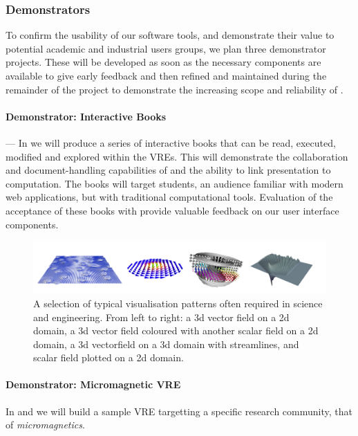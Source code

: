 \subsubsection{Demonstrators}


To confirm the usability of our software tools, and demonstrate their
value to potential academic and industrial users groups, we plan three
demonstrator projects. These will be developed as soon as the
necessary components are available to give early feedback and then
refined and maintained during the remainder of the project to
demonstrate the increasing scope and reliability of \TheProject.


\paragraph{Demonstrator: Interactive Books} ---
In   we will produce a series of interactive books
that can be read, executed, modified and explored within the
\TheProject VREs. This will demonstrate the collaboration and
document-handling capabilities of \TheProject and the ability to link
presentation to computation. The books will target students, an
audience familiar with modern web applications, but with traditional
computational tools. Evaluation of the acceptance of these books with
provide valuable feedback on our user interface components.

\begin{figure}
\includegraphics[width=1.0\textwidth]{Pictures/micromagnetic-and-3d-vis-4x1.pdf}
\caption{\label{fig:3d-plots} A selection of typical visualisation patterns often required in science and engineering. From left to right: a 3d vector field on a 2d domain, a 3d vector field coloured with another scalar field on a 2d domain, a 3d vectorfield on a 3d domain with streamlines, and scalar field plotted on a 2d domain.}
\end{figure}

\paragraph{Demonstrator: Micromagnetic VRE}
\label{sec:introduction-micromagnetic-vre-demonstrator}In 
and  we will build
a sample VRE targetting a specific research community, that of \textit{micromagnetics}.

